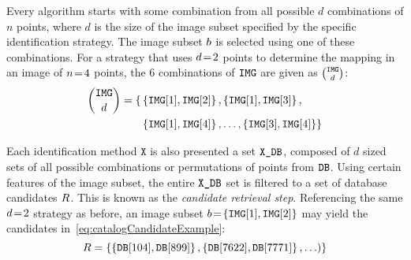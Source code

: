 Every algorithm starts with some combination from all possible $d$ combinations of $n$ points, where $d$ is the size of the image subset specified by the specific identification strategy.
The image subset $b$ is selected using one of these combinations.
For a strategy that uses $d\!=\!2$ points to determine the mapping in an image of $n\!=\! 4$ points, the 6 combinations of $\texttt{IMG}$ are given as $\binom{\texttt{IMG}}{d}$:
\begin{equation}
    \begin{aligned}
	    \binom{\texttt{IMG}}{d} = \{&
	    	\left\{ \texttt{IMG}[1], \texttt{IMG}[2] \right\},
	    	\left\{ \texttt{IMG}[1], \texttt{IMG}[3] \right\}, \\
	       &\left\{ \texttt{IMG}[1], \texttt{IMG}[4] \right\}, \ldots,
	        \left\{ \texttt{IMG}[3], \texttt{IMG}[4] \right\}
	        \}
    \end{aligned}
\end{equation}

Each identification method $\texttt{X}$ is also presented a set $\texttt{X\_DB}$, composed of $d$ sized sets of all possible combinations or permutations of points from $\texttt{DB}$.
Using certain features of the image subset, the entire $\texttt{X\_DB}$ set is filtered to a set of database candidates $R$.
This is known as the \emph{candidate retrieval step}.
Referencing the same $d\!=\! 2$ strategy as before, an image subset $b \!=\! \left\{ \texttt{IMG}[1], \texttt{IMG}[2] \right\}$ may yield the candidates in~\autoref{eq:catalogCandidateExample}:
\begin{equation}
	\label{eq:catalogCandidateExample}
    \databasesubset = \set{ \set{\vv{\databaseset[104]}, \vv{\databaseset[899]}}, \set{\vv{\databaseset[7622]}, \vv{\databaseset[7771]}}, \ldots) } 
\end{equation}

